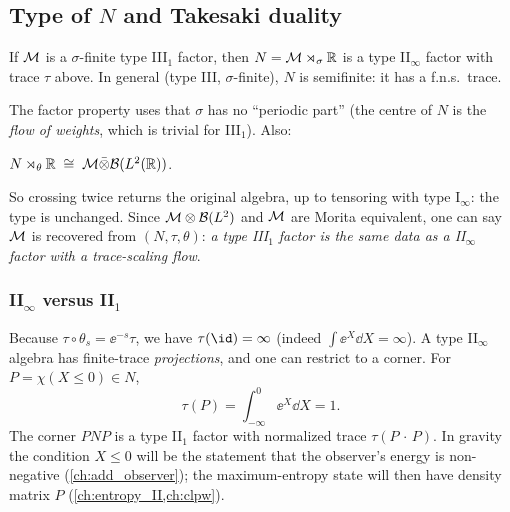 \subsection{Type of $N$ and Takesaki duality}

\begin{theorem}
If $\mathcal{M}$ is a $\sigma$-finite type III$_1$ factor, then $N=\mathcal{M}\rtimes_\sigma\mathbb{R}$ is a type II$_\infty$ factor with trace $\tau$ above. In general (type III, $\sigma$-finite), $N$ is semifinite: it has a f.n.s.\ trace.
\end{theorem}
The factor property uses that $\sigma$ has no ``periodic part'' (the centre of $N$ is the \emph{flow of weights}, which is trivial for III$_1$). Also:
\begin{theorem}
$N\rtimes_\theta\mathbb{R}\;\cong\;\mathcal{M}\bar\otimes\mathcal{B}(L^2(\mathbb{R}))$.
\end{theorem}
So crossing twice returns the original algebra, up to tensoring with type I$_\infty$: the type is unchanged. Since $\mathcal{M}\otimes\mathcal{B}(L^2)$ and $\mathcal{M}$ are Morita equivalent, one can say $\mathcal{M}$ is recovered from $(N,\tau,\theta)$: \emph{a type III$_1$ factor is the same data as a II$_\infty$ factor with a trace-scaling flow}.

\subsubsection*{II$_\infty$ versus II$_1$}
Because $\tau\circ\theta_s=\ee^{-s}\tau$, we have $\tau(\id)=\infty$ (indeed $\int\ee^{X}\dd X=\infty$). A type II$_\infty$ algebra has finite-trace \emph{projections}, and one can restrict to a corner. For $P=\chi(X\le0)\in N$,
\begin{equation}
\tau(P)=\int_{-\infty}^0\ee^{X}\dd X=1.
\end{equation}
The corner $PNP$ is a type II$_1$ factor with normalized trace $\tau(P\,\cdot\,P)$. In gravity the condition $X\le0$ will be the statement that the observer's energy is non-negative (\cref{ch:add_observer}); the maximum-entropy state will then have density matrix $P$ (\cref{ch:entropy_II,ch:clpw}).

